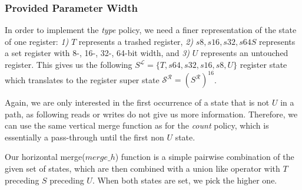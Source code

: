 \subsubsection{Provided Parameter Width}
\label{subsection:providedparamwideness}
In order to implement the \emph{type} policy, we need a finer representation of the state of one register:
\textit{1)} $T$ represents a trashed register,
\textit{2)} $s8, s16, s32, s64 S$ represents a set register with  8-, 16-, 32-, 64-bit width, and
\textit{3)} $U$ represents an untouched register.
This gives us the following $S^\mathcal{L} = \{ T, s64, s32, s16, s8, U \}$ register state which translates to the register 
super state $\mathcal{S}^\mathcal{R} = (S^\mathcal{R})^{16}$.

Again, we are only interested in the first occurrence of a state that is not $U$ in a path, as following reads or writes do not give us more information. Therefore, we can use the same vertical merge function as for the \emph{count} policy, which is essentially a pass-through until the first non $U$ state.

Our horizontal merge($merge\_h$) function is a simple pairwise combination of the given set of states, which are then combined with a union like operator with $T$ preceding $S$ preceding $U$. When both states are set, we pick the higher one.

